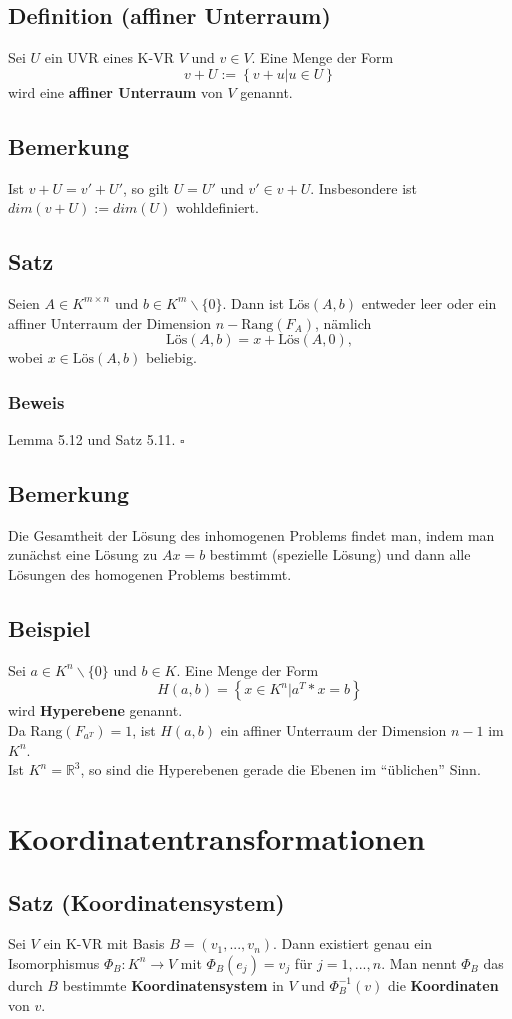 \documentclass{scrbook}
\begin{document}
\section{Definition (affiner Unterraum)} Sei $U$ ein UVR eines K-VR $V$ und $v \in V$. Eine Menge der Form\[v+U:=\left\{v+u|u\in U\right\}\] wird eine \textbf{affiner Unterraum} von $V$ genannt.
\section{Bemerkung}
Ist $v+U = v'+U'$, so gilt $U=U'$ und $v' \in v+U$. Insbesondere ist $dim(v+U) := dim(U)$ wohldefiniert.
\section{Satz}Seien $A\in K^{m \times n}$ und $b \in K^m\backslash \{0\}$. Dann ist Lös$(A,b)$ entweder leer oder ein affiner Unterraum der Dimension $n-\text{Rang}(F_A)$, nämlich\[\text{Lös}(A,b)=x+\text{Lös}(A,0),\] wobei $x\in \text{Lös}(A,b)$ beliebig.
\subsection*{Beweis} Lemma 5.12 und Satz 5.11. $\square$
\section{Bemerkung}
Die Gesamtheit der Lösung des inhomogenen Problems findet man, indem man zunächst eine Lösung zu $Ax=b$ bestimmt (spezielle Lösung) und dann alle Lösungen des homogenen Problems bestimmt.
\section{Beispiel}
Sei $a\in K^n \backslash \{0\}$ und $b\in K$. Eine Menge der Form\[H(a,b)=\left\{x\in K^n|a^T*x=b\right\}\] wird \textbf{Hyperebene} genannt.\\
Da Rang$(F_{a^T}) = 1$, ist $H(a,b)$ ein affiner Unterraum der Dimension $n-1$ im $K^n$.\\Ist $K^n=\mathbb{R}^3$, so sind die Hyperebenen gerade die Ebenen im "`üblichen"' Sinn.
\chapter{Koordinatentransformationen}
\section{Satz (Koordinatensystem)}
Sei $V$ ein K-VR mit Basis $B=(v_1,...,v_n)$. Dann existiert genau ein Isomorphismus $\Phi_B:K^n \rightarrow V$ mit $\Phi_B(e_j)=v_j$ für $j=1,...,n$. Man nennt $\Phi_B$ das durch $B$ bestimmte \textbf{Koordinatensystem} in $V$ und $\Phi^{-1}_B(v)$ die \textbf{Koordinaten} von $v$.
\end{document}

